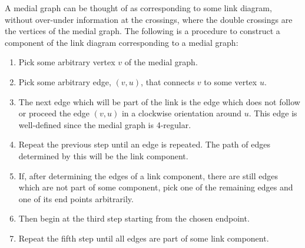 \documentclass[12pt]{article}
\begin{document}
\par A medial graph can be thought of as corresponding to some link diagram, without over-under information at the crossings, where the double crossings are the vertices of the medial graph. The following is a procedure to construct a component of the link diagram corresponding to a medial graph:
\begin{enumerate}
	\item Pick some arbitrary vertex $v$ of the medial graph.
	\item Pick some arbitrary edge, $(v,u)$, that connects $v$ to some vertex $u$.
	\item The next edge which will be part of the link is the edge which does not follow or proceed the edge $(v,u)$ in a clockwise orientation around $u$. This edge is well-defined since the medial graph is 4-regular. 
	\item  Repeat the previous step until an edge is repeated. The path of edges determined by this will be the link component.
	\item If, after determining the edges of a link component, there are still edges which are not part of some component, pick one of the remaining edges and one of its end points arbitrarily.
	\item Then begin at the third step starting from the chosen endpoint.
	\item Repeat the fifth step until all edges are part of some link component.
\end{enumerate}
\end{document}
